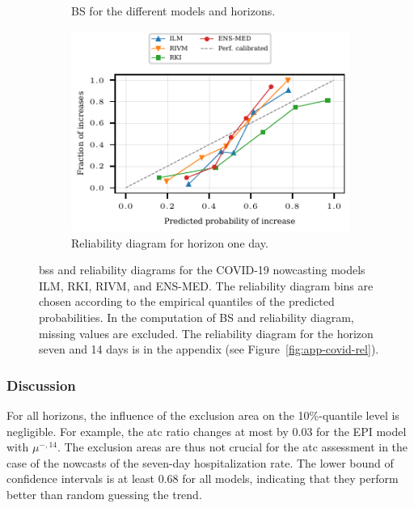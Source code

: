 \documentclass[pdflatex]{sn-jnl}
\theoremstyle{plain}%
\theoremstyle{definition}
\newcommand{\acc}{\mu}
\newcommand{\accml}[1][l]{\acc^{-,#1}}
\begin{document}
\begin{figure}
    \begin{subfigure}{0.48\textwidth}
        \centering
        \tiny
        
    \caption{BS for the different models and horizons.}\label{fig:app-covid-prob-brier}
    \end{subfigure}\hspace{0.01\textwidth}%
    \begin{subfigure}[t]{0.48\textwidth}
    \includegraphics{plots/covid_nowcast/60_reliability_diagram_lag_1}
    \caption{Reliability diagram for horizon one day.}\label{fig:app-covid-prob-rel-1}
    \end{subfigure}\hspace{0.01\textwidth}%
    \caption[Brier Scores and reliability diagrams for the COVID-19 nowcasting models ILM, RKI, RIVM, and ENS-MED.]{\aclp{bs} and reliability diagrams for the COVID-19 nowcasting models ILM, RKI, RIVM, and ENS-MED.
    The reliability diagram bins are chosen according to the empirical quantiles of the predicted probabilities.
    In the computation of BS and reliability diagram, missing values are excluded.
    The reliability diagram for the horizon seven and 14 days is in the appendix (see Figure~\ref{fig:app-covid-rel}).}
    \label{fig:app-covid-prob}
\end{figure}





\subsubsection*{Discussion}

For all horizons, the influence of the exclusion area on the 10\%-quantile level is negligible.
For example, the \ac{atc} ratio changes at most by 0.03 for the EPI model with $\accml[14]$.
The exclusion areas are thus not crucial for the \ac{atc} assessment in the case of the nowcasts of the seven-day hospitalization rate.
The lower bound of confidence intervals is at least 0.68 for all models, indicating that they perform better than random guessing the trend.
\end{document}
